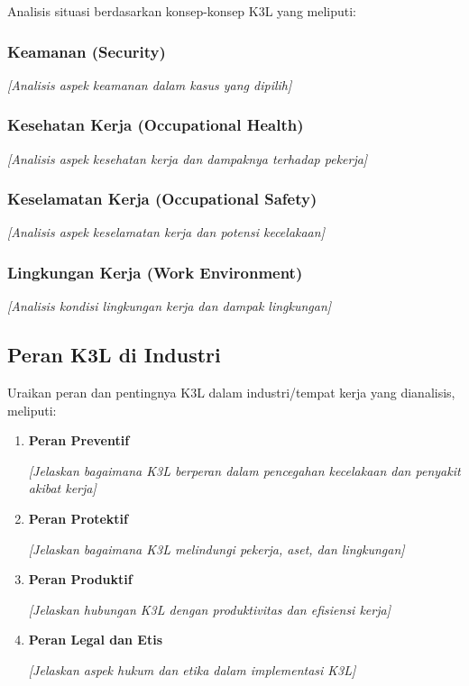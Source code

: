 Analisis situasi berdasarkan konsep-konsep K3L yang meliputi:

\subsubsection{Keamanan (Security)}
\textit{[Analisis aspek keamanan dalam kasus yang dipilih]}

\subsubsection{Kesehatan Kerja (Occupational Health)}
\textit{[Analisis aspek kesehatan kerja dan dampaknya terhadap pekerja]}

\subsubsection{Keselamatan Kerja (Occupational Safety)}
\textit{[Analisis aspek keselamatan kerja dan potensi kecelakaan]}

\subsubsection{Lingkungan Kerja (Work Environment)}
\textit{[Analisis kondisi lingkungan kerja dan dampak lingkungan]}

\vspace{1cm}

\subsection{Peran K3L di Industri}
\label{subsec:peran-k3l}


Uraikan peran dan pentingnya K3L dalam industri/tempat kerja yang dianalisis, meliputi:

\begin{enumerate}[label=\alph*.]
    \item \textbf{Peran Preventif}
    
    \textit{[Jelaskan bagaimana K3L berperan dalam pencegahan kecelakaan dan penyakit akibat kerja]}
    
    \item \textbf{Peran Protektif}
    
    \textit{[Jelaskan bagaimana K3L melindungi pekerja, aset, dan lingkungan]}
    
    \item \textbf{Peran Produktif}
    
    \textit{[Jelaskan hubungan K3L dengan produktivitas dan efisiensi kerja]}
    
    \item \textbf{Peran Legal dan Etis}
    
    \textit{[Jelaskan aspek hukum dan etika dalam implementasi K3L]}
\end{enumerate}

